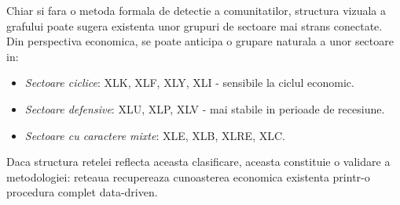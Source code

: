 Chiar si fara o metoda formala de detectie a comunitatilor, structura vizuala
a grafului poate sugera existenta unor grupuri de sectoare mai strans conectate.
Din perspectiva economica, se poate anticipa o grupare naturala a unor sectoare in:
\begin{itemize}
    \item \textit{Sectoare ciclice}: XLK, XLF, XLY, XLI - sensibile la
    ciclul economic.
    \item \textit{Sectoare defensive}: XLU, XLP, XLV - mai stabile in
    perioade de recesiune.
    \item \textit{Sectoare cu caractere mixte}: XLE, XLB, XLRE, XLC.
\end{itemize}

Daca structura retelei reflecta aceasta clasificare, aceasta constituie o
validare a metodologiei: reteaua recupereaza cunoasterea economica existenta
printr-o procedura complet data-driven.

